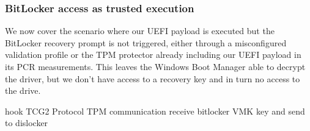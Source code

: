 \subsubsection{BitLocker access as trusted execution}

We now cover the scenario where our \ac{UEFI} payload is executed but the BitLocker recovery prompt is not triggered, either through a misconfigured validation profile or the \ac{TPM} protector already including our \ac{UEFI} payload in its \ac{PCR} measurements. This leaves the Windows Boot Manager able to decrypt the driver, but we don't have access to a recovery key and in turn no access to the drive.

hook \ac{TCG}2 Protocol \cite[6.7.3]{tcg-efi-protocol-spec}
\ac{TPM} communication
receive bitlocker \ac{VMK} key and send to dislocker
\cite{bde-format-spec}
\cite{tpm-sniffing}

